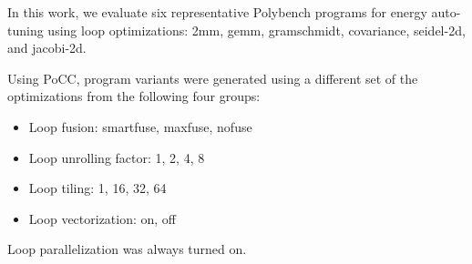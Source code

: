 In this work, we evaluate six representative Polybench programs for energy auto-tuning using
loop optimizations: 2mm, gemm, gramschmidt, covariance, seidel-2d, and jacobi-2d.

Using PoCC, program variants were generated using
a different set of the 
optimizations from the following four groups: 
\begin{itemize}
    \item Loop fusion: smartfuse, maxfuse, nofuse
    \item Loop unrolling factor: 1, 2, 4, 8
    \item Loop tiling: 1, 16, 32, 64 %
    \item Loop vectorization: on, off
\end{itemize}
Loop parallelization was always turned on.
